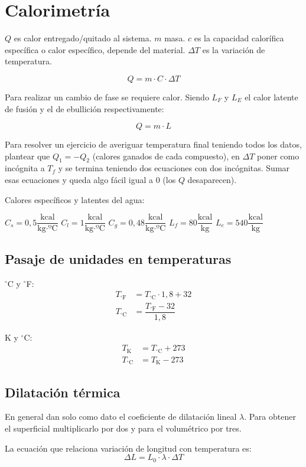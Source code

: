\section{Calorimetría}

$Q$ es calor entregado/quitado al sistema. $m$ masa. $c$ es la capacidad calorífica específica o calor específico, depende del material. $\Delta T$ es la variación de temperatura.

$$ Q = m \cdot C \cdot \Delta T$$

Para realizar un cambio de fase se requiere calor. Siendo $L_F$ y $L_E$ el calor latente de fusión y el de ebullición respectivamente:

$$Q = m \cdot L$$

Para resolver un ejercicio de averiguar temperatura final teniendo todos los datos, plantear que $Q_1=-Q_2$ (calores ganados de cada compuesto), en $\Delta T$ poner como incógnita a $T_f$ y se termina teniendo dos ecuaciones con dos incógnitas. Sumar esas ecuaciones y queda algo fácil igual a 0 (los $Q$ desaparecen).

\skipline
Calores específicos y latentes del agua:

\vspace{0.5\baselineskip}
\hfil
$C_s=0,5 \dfrac{\text{kcal}}{\text{kg} \cdot \text{ºC}}$\hfil
$C_l=1 \dfrac{\text{kcal}}{\text{kg} \cdot \text{ºC}}$\hfil
$C_g=0,48 \dfrac{\text{kcal}}{\text{kg} \cdot \text{ºC}}$\hfil
$L_f = 80 \dfrac{\text{kcal}}{\text{kg}}$\hfil
$L_e = 540 \dfrac{\text{kcal}}{\text{kg}}$\hfil


\subsection*{Pasaje de unidades en temperaturas}

\begin{multicols}{2}
$^\circ$C y $^\circ$F:
\vspace{-\baselineskip}
\begin{align*}
T_{^\circ\text{F}}&= T_{\text{$^\circ$C}} \cdot 1,8 + 32\\
T_{\text{$^\circ$C}} &= \dfrac{T_{^\circ\text{F}}-32}{1,8}
\end{align*}

K y $^\circ$C:
\vspace{-\baselineskip}
\begin{align*}
T_{\text{K}}&=T_{\text{$^\circ$C}} + 273\\
T_{\text{$^\circ$C}} &=  T_{\text{K}} - 273
\end{align*}
\end{multicols}

\subsection*{Dilatación térmica}

En general dan solo como dato el coeficiente de dilatación lineal $\lambda$. Para obtener el superficial multiplicarlo por dos y para el volumétrico por tres.

La ecuación que relaciona variación de longitud con temperatura es:
$$\Delta L = L_0 \cdot \lambda \cdot \Delta T $$